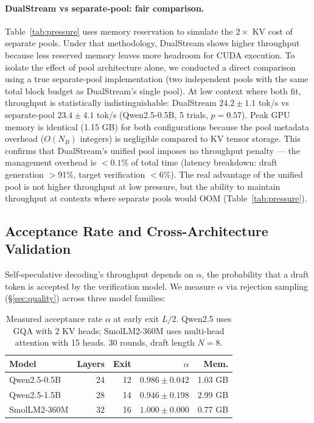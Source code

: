 \documentclass[review]{elsarticle}
\theoremstyle{definition}
\theoremstyle{remark}
\begin{document}
\paragraph{DualStream vs separate-pool: fair comparison.}
Table~\ref{tab:pressure} uses memory reservation to simulate the $2\times$
KV cost of separate pools. Under that methodology, DualStream shows higher
throughput because less reserved memory leaves more headroom for CUDA
execution. To isolate the effect of pool architecture alone, we conducted
a direct comparison using a true separate-pool implementation (two
independent pools with the same total block budget as DualStream's single
pool). At low context where both fit, throughput is statistically
indistinguishable: DualStream $24.2 \pm 1.1$ tok/s vs separate-pool
$23.4 \pm 4.1$ tok/s (Qwen2.5-0.5B, 5 trials, $p = 0.57$). Peak GPU
memory is identical (1.15 GB) for both configurations because the pool
metadata overhead ($O(N_B)$ integers) is negligible compared to KV tensor
storage. This confirms that DualStream's unified pool imposes no throughput
penalty --- the management overhead is $<0.1\%$ of total time (latency breakdown:
draft generation $>$91\%, target verification $<$6\%). The real advantage
of the unified pool is not higher throughput at low pressure, but the
ability to maintain throughput at contexts where separate pools would
OOM (Table~\ref{tab:pressure}).

\subsection{Acceptance Rate and Cross-Architecture Validation}

Self-speculative decoding's throughput depends on $\alpha$, the probability
that a draft token is accepted by the verification model. We measure $\alpha$
via rejection sampling (\S\ref{sec:quality}) across three model families:

\begin{table}[t]
\centering
\caption{Measured acceptance rate $\alpha$ at early exit $L/2$.
Qwen2.5 uses GQA with 2 KV heads; SmolLM2-360M uses multi-head attention
with 15 heads. 30 rounds, draft length $N=8$.}
\label{tab:acceptance}
\begin{tabular}{lrrrr}
\toprule
Model & Layers & Exit & $\alpha$ & Mem. \\
\midrule
Qwen2.5-0.5B  & 24 & 12 & $0.986 \pm 0.042$ & 1.03 GB \\
Qwen2.5-1.5B  & 28 & 14 & $0.946 \pm 0.198$ & 2.99 GB \\
SmolLM2-360M  & 32 & 16 & $1.000 \pm 0.000$ & 0.77 GB \\
\bottomrule
\end{tabular}
\end{table}
\end{document}
